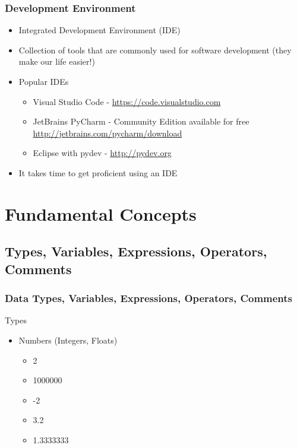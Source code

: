 \documentclass[10pt, a4paper]{beamer} %
\begin{document}
\begin{frame}[c]\frametitle{Development Environment}

\begin{itemize}
    \item Integrated Development Environment (IDE)
    \item Collection of tools that are commonly used for software development (they make our life easier!)
    \item Popular IDEs
    \begin{itemize}
        \item Visual Studio Code - \url{https://code.visualstudio.com}
        \item JetBrains PyCharm - Community Edition available for free \url{http://jetbrains.com/pycharm/download}
        \item Eclipse with pydev - \url{http://pydev.org}
    \end{itemize}
    \item It takes time to get proficient using an IDE
\end{itemize}
\end{frame}


\section{Fundamental Concepts} %
\label{sec:fundamental_concepts}

\subsection{Types, Variables, Expressions, Operators, Comments} %
\label{sub:Types_variables_expressions_operators_comments}

\begin{frame}[c]\frametitle{Data Types, Variables, Expressions, Operators, Comments}
\begin{block}{Types}
  \begin{itemize}
    \item Numbers (Integers, Floats)
    \begin{itemize}
      \item 2
      \item 1000000
      \item -2
      \item 3.2
      \item 1.3333333
    \end{itemize}
  \end{itemize}
\end{block}
  
\end{frame}
\end{document}
